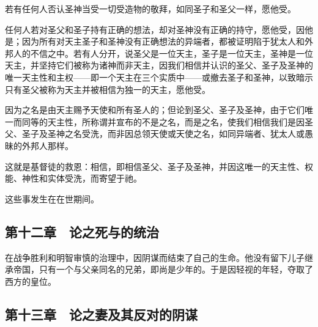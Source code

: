 若有任何人否认圣神当受一切受造物的敬拜，如同圣子和圣父一样，愿他受。\par

任何人若对圣父和圣子持有正确的想法，却对圣神没有正确的持守，愿他受，因他是；因为所有对天主圣子和圣神没有正确想法的异端者，都被证明陷于犹太人和外邦人的不信之中。若有人分开，说圣父是一位天主，圣子是一位天主，圣神是一位天主，并坚持它们被称为诸神而非天主，因我们相信并认识的圣父、圣子及圣神的唯一天主性和主权——即一个天主在三个实质中——或撤去圣子和圣神，以致暗示只有圣父被称为天主并被相信为独一的天主，愿他受。\par

因为之名是由天主赐予天使和所有圣人的；但论到圣父、圣子及圣神，由于它们唯一而同等的天主性，所称谓并宣布的不是之名，而是之名，使我们相信我们是因圣父、圣子及圣神之名受洗，而非因总领天使或天使之名，如同异端者、犹太人或愚昧的外邦人那样。\par

这就是基督徒的救恩：相信，即相信圣父、圣子及圣神，并因这唯一的天主性、权能、神性和实体受洗，而寄望于祂。\par

这些事发生在在世期间。\par


\subsection{第十二章　论之死与的统治}

在战争胜利和明智审慎的治理中，因阴谋而结束了自己的生命。他没有留下儿子继承帝国，只有一个与父亲同名的兄弟，即尚是少年的。于是因轻视的年轻，夺取了西方的皇位。\par


\subsection{第十三章　论之妻及其反对的阴谋}

